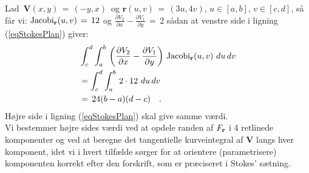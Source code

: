 \begin{example} \label{exampStokesPlane}
Lad $\,\mathbf{V}(x,y) \, = \, \left( -y, x \right) \,$ og  $\mathbf{r}(u,v) \, = \, (3u, 4v)$, $u \in [a,b]$, $v \in [c,d]$,  så får vi:
$\operatorname{Jacobi}_{\mathbf{r}}(u,v)\, = \, 12$ og $\frac{\partial V_{2}}{\partial x} -  \frac{\partial V_{1}}{\partial y} \, = \, 2$ sådan at venstre side i ligning (\ref{eqStokesPlan}) giver:
\begin{equation} \label{eqStokesPlanEx}
\begin{aligned}
&\int_{c}^{d}\int_{a}^{b}\, \left( \frac{\partial V_{2}}{\partial x} -  \frac{\partial V_{1}}{\partial y}\right) \, \operatorname{Jacobi}_{\mathbf{r}}(u,v)\,
\,du \, dv \\
&= \int_{c}^{d}\int_{a}^{b}\, 2\cdot 12 \,
\,du \, dv \\
&= \, 24(b-a)(d-c) \quad .
\end{aligned}
\end{equation}
Højre side i ligning (\ref{eqStokesPlan}) skal give samme værdi.\\

Vi bestemmer  højre sides værdi ved at opdele randen af $F_{\bf{r}}$ i 4 retlinede komponenter og ved at beregne det tangentielle kurveintegral af $\mathbf{V}$ langs hver komponent, idet vi i hvert tilfælde sørger for at orientere (parametrisere) komponenten korrekt efter den forskrift, som er præciseret i Stokes' sætning. \\


\end{example}
